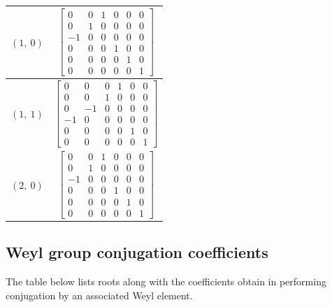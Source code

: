 \documentclass[11pt]{article}
\theoremstyle{definition}
\begin{document}
\begin{longtable}{|l|c|}
    \hline
    $\left( 1, \  0\right)$ & ${\left[\begin{matrix}0 & 0 & 1 & 0 & 0 & 0\\0 & 1 & 0 & 0 & 0 & 0\\-1 & 0 & 0 & 0 & 0 & 0\\0 & 0 & 0 & 1 & 0 & 0\\0 & 0 & 0 & 0 & 1 & 0\\0 & 0 & 0 & 0 & 0 & 1\end{matrix}\right]}$ \\
    \hline
    $\left( 1, \  1\right)$ & ${\left[\begin{matrix}0 & 0 & 0 & 1 & 0 & 0\\0 & 0 & 1 & 0 & 0 & 0\\0 & -1 & 0 & 0 & 0 & 0\\-1 & 0 & 0 & 0 & 0 & 0\\0 & 0 & 0 & 0 & 1 & 0\\0 & 0 & 0 & 0 & 0 & 1\end{matrix}\right]}$ \\
    \hline
    $\left( 2, \  0\right)$ & ${\left[\begin{matrix}0 & 0 & 1 & 0 & 0 & 0\\0 & 1 & 0 & 0 & 0 & 0\\-1 & 0 & 0 & 0 & 0 & 0\\0 & 0 & 0 & 1 & 0 & 0\\0 & 0 & 0 & 0 & 1 & 0\\0 & 0 & 0 & 0 & 0 & 1\end{matrix}\right]}$ \\
    \hline
\end{longtable}


\subsection{Weyl group conjugation coefficients}

The table below lists roots along with the coefficients obtain in performing conjugation by an associated Weyl element.

\bigskip
\end{document}

